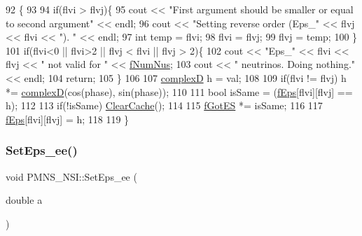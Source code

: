 \begin{DoxyCode}
92                                                                  \{
93 
94   \textcolor{keywordflow}{if}(flvi > flvj)\{
95     cout << \textcolor{stringliteral}{"First argument should be smaller or equal to second argument"} << endl;
96     cout << \textcolor{stringliteral}{"Setting reverse order (Eps\_"} << flvj << flvi << \textcolor{stringliteral}{"). "} << endl;
97     \textcolor{keywordtype}{int} temp = flvi;
98     flvi = flvj;
99     flvj = temp;
100   \}
101   \textcolor{keywordflow}{if}(flvi<0 || flvi>2 || flvj < flvi || flvj > 2)\{
102     cout << \textcolor{stringliteral}{"Eps\_"} << flvi << flvj << \textcolor{stringliteral}{" not valid for "} << \hyperlink{classOscProb_1_1PMNS__Base_a24bb74bed63569dfe88b18fa6a08060e}{fNumNus};
103     cout << \textcolor{stringliteral}{" neutrinos. Doing nothing."} << endl;
104     \textcolor{keywordflow}{return};
105   \}
106 
107   \hyperlink{EigenPoint_8h_a67ca8e107e20610c3fff78d5e726ece0}{complexD} h = val;  
108 
109   \textcolor{keywordflow}{if}(flvi != flvj) h *= \hyperlink{EigenPoint_8h_a67ca8e107e20610c3fff78d5e726ece0}{complexD}(cos(phase), sin(phase)); 
110 
111   \textcolor{keywordtype}{bool} isSame = (\hyperlink{classOscProb_1_1PMNS__NSI_ab9328cb72e868b395f3efdd75b6af5e4}{fEps}[flvi][flvj] == h);
112   
113   \textcolor{keywordflow}{if}(!isSame) \hyperlink{classOscProb_1_1PMNS__Base_ac47fd33e69aa6490f99e2fd147a92f03}{ClearCache}();
114 
115   \hyperlink{classOscProb_1_1PMNS__Base_a6dc5cd010d2d70b2324745b4e53e9839}{fGotES} *= isSame;
116   
117   \hyperlink{classOscProb_1_1PMNS__NSI_ab9328cb72e868b395f3efdd75b6af5e4}{fEps}[flvi][flvj] = h;
118   
119 \}
\end{DoxyCode}
\mbox{\label{classOscProb_1_1PMNS__NSI_a13ecb89c4d43924d23833a9e930f50e0}} 
\subsubsection{\texorpdfstring{Set\+Eps\+\_\+ee()}{SetEps\_ee()}}
{\footnotesize\ttfamily void P\+M\+N\+S\+\_\+\+N\+S\+I\+::\+Set\+Eps\+\_\+ee (\begin{DoxyParamCaption}\item[{double}]{a }\end{DoxyParamCaption})\hspace{0.3cm}{\ttfamily [virtual]}}

